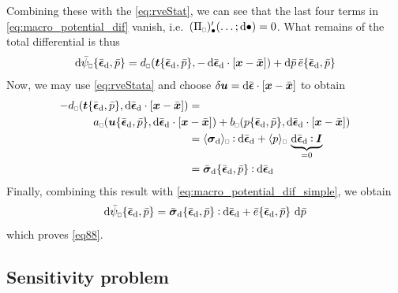 \documentclass{bmcart}
\newcommand{\eqtref}[1]{\eqref{#1}}
\DeclarePairedDelimiter{\homgen}{\langle}{\rangle_\rve}
\renewcommand{\dev}{\mathrm{d}}
\newcommand{\epspargs}{\{{\bar{\ts\epsilon}}_\dev, \bar{p}\}}
\newcommand{\rve}{
  {\mathchoice
   {\mbox{\scalebox{0.67}{$\Box$}}}
   {\mbox{\scalebox{0.67}{$\Box$}}}
   {\mbox{\scalebox{0.5}{$\Box$}}}
   {\mbox{\scalebox{0.375}{$\Box$}}}
  }
}
\begin{document}
Combining these with the \eqtref{eq:rveStat}, we can see that the last four terms in \eqtref{eq:macro_potential_dif} vanish, i.e.\ $(\Pi_\rve)'_\bullet(\ldots; \dif\bullet) = 0$.
What remains of the total differential is thus
\begin{align}
 \dif\bar{\psi}_\rve\epspargs = 
  d_\rve(\ta t\epspargs, -\dif\bar{\ts\epsilon}_\dev\cdot[\ta x-\bar{\ta x}]) + \dif\bar{p}\, \bar{e}\epspargs
\label{eq:macro_potential_dif_simple}
\end{align}
Now, we may use \eqtref{eq:rveStata} and choose $\delta\boldsymbol{u} = \operatorname{d \!}\bar{\boldsymbol{\epsilon}}\cdot[\boldsymbol{x} - \bar{\boldsymbol{x}}]$ to obtain
\begin{align}
 -d_\rve(\ta t\epspargs, \dif\bar{\ts\epsilon}_\dev\cdot[\ta x - \bar{\ta x}]) &= 
\nonumber\\
  a_\rve(\ta u\epspargs, \dif\bar{\ts\epsilon}_\dev\cdot[\ta x &- \bar{\ta x}]) + b_\rve(p\epspargs, \dif\bar{\ts\epsilon}_\dev\cdot[\ta x - \bar{\ta x}]) 
\nonumber\\
  &= \homgen{\ts\sigma_\dev}\dprod\dif\bar{\ts\epsilon}_\dev + \homgen{p }\,\underbrace{\dif\bar{\ts\epsilon}_\dev\dprod \ts I}_{=0}
\nonumber\\
  &= \bar{\ts\sigma}_\dev\epspargs \dprod\dif\bar{\ts\epsilon}_\dev
\end{align}
Finally, combining this result with \eqtref{eq:macro_potential_dif_simple}, we obtain
\begin{align}
 \dif\bar{\psi}_\rve\epspargs = \bar{\ts\sigma}_\dev\epspargs\dprod \dif\bar{\ts\epsilon}_\dev + \bar{e}\epspargs\,\dif\bar{p}
\end{align}
which proves \eqtref{eq88}.

\subsection{Sensitivity problem}
\label{appendix:sensitivity}
\end{document}
